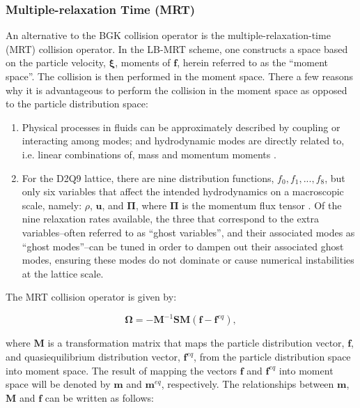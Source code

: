 \documentclass{article}
\newcommand{\pvel}{\boldsymbol{\xi}}
\newcommand{\colop}{\boldsymbol{\Omega}}
\newcommand{\transM}{\mathbf{M}}
\newcommand{\relaxM}{\mathbf{S}}
\begin{document}
\subsubsection{Multiple-relaxation Time (MRT)}

An alternative to the BGK collision operator is the multiple-relaxation-time (MRT) collision operator.
In the LB-MRT scheme, one constructs a space based on the particle velocity, $\pvel$, moments of $\mathbf{f}$, herein referred to as the ``moment space''.
The collision is then performed in the moment space.
There a few reasons why it is advantageous to perform the collision in the moment space as opposed to the particle distribution space:
\begin{enumerate}
    \item Physical processes in fluids can be approximately described by coupling or interacting among modes; and hydrodynamic modes are directly related to, i.e. linear combinations of, mass and momentum moments \cite{lallemand2000theory}.
    \item For the D2Q9 lattice, there are nine distribution functions, $f_0, f_1, ..., f_8$, but only six variables that affect the intended hydrodynamics on a macroscopic scale, namely: $\rho$, $\mathbf{u}$, and $\mathbf{\Pi}$, where $\mathbf{\Pi}$ is the momentum flux tensor \cite{dellar2003incompressible}.
    Of the nine relaxation rates available, the three that correspond to the extra variables--often referred to as ``ghost variables'', and their associated modes as ``ghost modes''--can be tuned in order to dampen out their associated ghost modes, ensuring these modes do not dominate or cause numerical instabilities at the lattice scale.
\end{enumerate}

The MRT collision operator is given by:

\begin{equation} \label{eq:mrt-colop}
	\colop = - {\transM}^{-1} \relaxM \transM (\mathbf{f} - \mathbf{f}^{eq}),
\end{equation}

\noindent where $\transM$ is a transformation matrix that maps the particle distribution vector, $\mathbf{f}$, and quasiequilibrium distribution vector, $\mathbf{f}^{eq}$, from the particle distribution space into moment space.
The result of mapping the vectors $\mathbf{f}$ and $\mathbf{f}^{eq}$ into moment space will be denoted by $\mathbf{m}$ and $\mathbf{m}^{eq}$, respectively.
The relationships between $\mathbf{m}$, $\transM$ and $\mathbf{f}$ can be written as follows:
\end{document}
